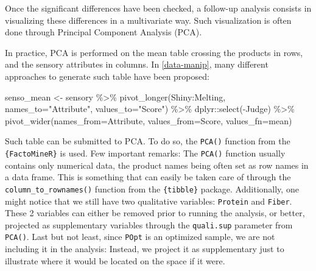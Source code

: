 \documentclass[
]{book}
\newenvironment{Shaded}{\begin{snugshade}}{\end{snugshade}}
\newcommand{\AttributeTok}[1]{\textcolor[rgb]{0.77,0.63,0.00}{#1}}
\newcommand{\FunctionTok}[1]{\textcolor[rgb]{0.00,0.00,0.00}{#1}}
\newcommand{\NormalTok}[1]{#1}
\newcommand{\OtherTok}[1]{\textcolor[rgb]{0.56,0.35,0.01}{#1}}
\newcommand{\SpecialCharTok}[1]{\textcolor[rgb]{0.00,0.00,0.00}{#1}}
\newcommand{\StringTok}[1]{\textcolor[rgb]{0.31,0.60,0.02}{#1}}
\begin{document}
Once the significant differences have been checked, a follow-up analysis consists in visualizing these differences in a multivariate way. Such visualization is often done through Principal Component Analysis (PCA).

In practice, PCA is performed on the mean table crossing the products in rows, and the sensory attributes in columns. In \ref{data-manip}, many different approaches to generate such table have been proposed:

\begin{Shaded}
\begin{Highlighting}[]
\NormalTok{senso\_mean }\OtherTok{\textless{}{-}}\NormalTok{ sensory }\SpecialCharTok{\%\textgreater{}\%} 
  \FunctionTok{pivot\_longer}\NormalTok{(Shiny}\SpecialCharTok{:}\NormalTok{Melting, }\AttributeTok{names\_to=}\StringTok{"Attribute"}\NormalTok{, }\AttributeTok{values\_to=}\StringTok{"Score"}\NormalTok{) }\SpecialCharTok{\%\textgreater{}\%} 
\NormalTok{  dplyr}\SpecialCharTok{::}\FunctionTok{select}\NormalTok{(}\SpecialCharTok{{-}}\NormalTok{Judge) }\SpecialCharTok{\%\textgreater{}\%} 
  \FunctionTok{pivot\_wider}\NormalTok{(}\AttributeTok{names\_from=}\NormalTok{Attribute, }\AttributeTok{values\_from=}\NormalTok{Score, }\AttributeTok{values\_fn=}\NormalTok{mean)}
\end{Highlighting}
\end{Shaded}

Such table can be submitted to PCA. To do so, the \texttt{PCA()} function from the \texttt{\{FactoMineR\}} is used.
Few important remarks: The \texttt{PCA()} function usually contains only numerical data, the product names being often set as row names in a data frame. This is something that can easily be taken care of through the \texttt{column\_to\_rownames()} function from the \texttt{\{tibble\}} package. Additionally, one might notice that we still have two qualitative variables: \texttt{Protein} and \texttt{Fiber}. These 2 variables can either be removed prior to running the analysis, or better, projected as supplementary variables through the \texttt{quali.sup} parameter from \texttt{PCA()}. Last but not least, since \texttt{POpt} is an optimized sample, we are not including it in the analysis: Instead, we project it as supplementary just to illustrate where it would be located on the space if it were.
\end{document}
